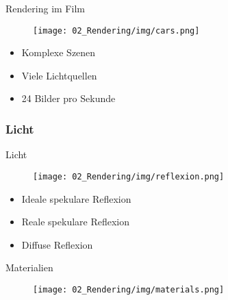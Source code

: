 \begin{frame}{\Huge{Rendering im Film}}
		
		\begin{figure}
				\centering
					\texttt{[image: 02\_Rendering/img/cars.png]}
				\centering
		\end{figure}
		
		\begin{itemize}
			\item Komplexe Szenen
			\item Viele Lichtquellen
			\item 24 Bilder pro Sekunde
		\end{itemize}
		
	\end{frame}
	
	\subsubsection{Licht}
	
\begin{frame}{\Huge{Licht}}
		
		\begin{figure}
				\centering
					\texttt{[image: 02\_Rendering/img/reflexion.png]}
				\centering
		\end{figure}
		
		\begin{itemize}
			\item Ideale spekulare Reflexion
			\item Reale spekulare Reflexion
			\item Diffuse Reflexion
		\end{itemize}
		
	\end{frame}
	
	\begin{frame}{\colorbox{black!10}{\Huge{Materialien}}}
		
		\begin{figure}
				\centering
					\texttt{[image: 02\_Rendering/img/materials.png]}
				\centering
		\end{figure}
		
	\end{frame}
	
